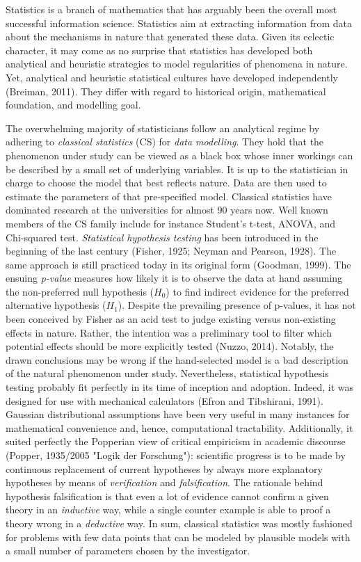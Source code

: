 \documentclass[authoryear,review,3p]{elsarticle}
\begin{document}
Statistics is a branch of mathematics that has arguably been the
overall most successful information science.
Statistics aim at extracting information from data
about the mechanisms in nature that generated these data.
%
Given its eclectic character, it may come as no surprise that statistics
has developed both analytical and heuristic strategies
to model regularities of phenomena in nature.
Yet, analytical and heuristic statistical cultures
have developed independently (Breiman, 2011).
They differ with regard to historical origin, mathematical foundation,
and modelling goal.

The overwhelming majority of statisticians
follow an analytical regime by
adhering to \textit{classical statistics} (CS) for
\textit{data modelling}.
They hold that the phenomenon under study can be viewed as a black box
whose inner workings can be described by a small set of
underlying variables.
It is up to the statistician in charge
to choose the model that best reflects nature.
Data are then used to estimate the parameters of that pre-specified model.
Classical statistics have dominated research at the universities
for almost 90 years now.
%
Well known members of the CS family include for instance
Student's t-test, ANOVA,
and Chi-squared test.
\textit{Statistical hypothesis testing} has been introduced in the beginning
of the last century (Fisher, 1925; Neyman and Pearson, 1928).
The same approach is still practiced today in its original form (Goodman, 1999).  
%
The ensuing \textit{p-value} measures how likely it is
to observe the data at hand
assuming the non-preferred null hypothesis ($H_0$)
to find indirect evidence
for the preferred alternative hypothesis ($H_1$).
%
Despite the prevailing presence of p-values,
it has not been conceived by Fisher as an acid test
to judge existing versus non-existing effects in nature.
Rather, the intention was a preliminary tool to
filter which potential effects should be more explicitly tested (Nuzzo, 2014).
%
Notably, the drawn conclusions may be wrong
if the hand-selected model is a bad description of
the natural phenomenon under study.
%
Nevertheless, statistical hypothesis testing probably fit perfectly
in its time of inception and adoption.
Indeed, it was designed for use with mechanical calculators
(Efron and Tibshirani, 1991). Gaussian distributional assumptions
have been very useful in many instances for
mathematical convenience and, hence, computational tractability.
Additionally, it suited perfectly the Popperian view of
critical empiricism in academic discourse
(Popper, 1935/2005 "Logik der Forschung"):
scientific progress is to be made by continuous replacement of current
hypotheses by always more explanatory hypotheses
by means of \textit{verification} and \textit{falsification}.
The rationale behind hypothesis falsification
is that even a lot of evidence cannot confirm
a given theory in an \textit{inductive} way, 
while a single counter example is able to proof a theory wrong
in a \textit{deductive} way.
%
In sum,
classical statistics was mostly fashioned
for problems with few data points that can be modeled 
by plausible models with a small number of parameters chosen by the
investigator.
\end{document}
